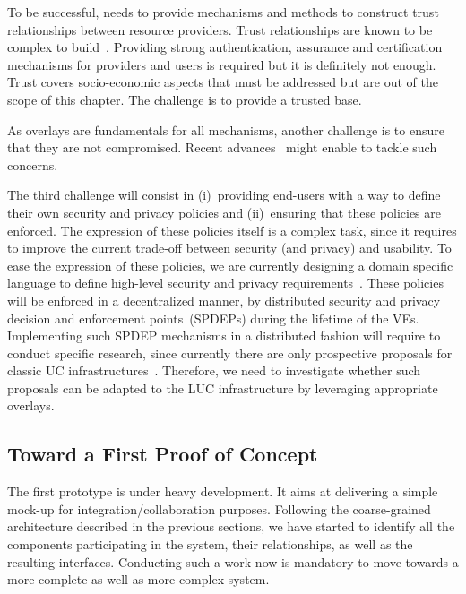To be successful, \discovery needs to provide mechanisms and methods to construct trust relationships between resource providers.
Trust relationships are known to be complex to build~\cite{Miller:2010:TWT:1907636.1907726}. Providing strong authentication, assurance and certification mechanisms for 
providers and users is required but it is definitely not enough. Trust covers socio-economic aspects that must be addressed but are out of the scope of this chapter.
The challenge is to provide a trusted \discovery base.

As overlays are fundamentals for all \discovery mechanisms, another challenge is to ensure
that they are not compromised. Recent advances~\cite{Castro:2002:SRS:844128.844156} might enable to tackle such concerns.

The third challenge will consist in (i)~providing end-users with a way to define their own security and privacy policies and (ii)~ensuring that these policies are enforced. 
The expression of these policies itself is a complex task, since it requires
to improve the current trade-off between security (and privacy) and usability.
To ease the expression of these policies, we are currently designing a domain specific language
to define high-level security and privacy requirements~\cite{rouzaud_book13b,alefray:hpdc:2013}. 
These policies will be enforced in a decentralized manner,
by distributed security and privacy decision and enforcement points~(SPDEPs) during the lifetime of the VEs.
Implementing such SPDEP mechanisms in a distributed fashion will require to
conduct specific research, since currently there are only prospective proposals for
classic UC infrastructures~\cite{Bacon:2010:EEA:2023718.2023739,sandhu_towards_2010}. 
Therefore, we need to investigate whether such proposals can be adapted to the LUC
infrastructure by leveraging appropriate overlays.


\subsection{Toward a First Proof of Concept}

The first prototype is under heavy development. It aims at delivering a
simple mock-up for integration/collaboration purposes.  Following the
coarse-grained architecture described in the previous sections, we have
started to identify all the components participating in the system, their
relationships, as well as the resulting interfaces. 
Conducting such a work now is mandatory to move towards a more complete as well
as more complex system. 

